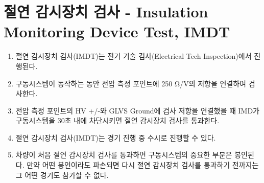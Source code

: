 \documentclass[final,a4paper,10pt]{report}
\begin{document}
\section{절연 감시장치 검사 - Insulation Monitoring Device Test, IMDT}\label{rule:formula-technical.imd-test}
\begin{enumerate}
  \item\label{rule:formula-technical.imd-test.performed-during-tech-inspection} 절연 감시장치 검사(IMDT)는 전기 기술 검사(Electrical Tech Inspection)에서 진행된다.
  \item\label{rule:formula-technical.imd-test.test-resistor-250ohmv} 구동시스템이 동작하는 동안 전압 측정 포인트에 250 Ω/V의 저항을 연결하여 검사한다.
  \item\label{rule:formula-technical.imd-test.trip-within-30s} 전압 측정 포인트의 HV +/-와 GLVS Ground에 검사 저항을 연결했을 때 IMD가 구동시스템을 30초 내에 차단시키면 절연 감시장치 검사를 통과한다.
  \item\label{rule:formula-technical.imd-test.retest-anytime-during-event} 절연 감시장치 검사(IMDT)는 경기 진행 중 수시로 진행할 수 있다.
  \item\label{rule:formula-technical.imd-test.broken-seal-bars-participation} 차량이 처음 절연 감시장치 검사를 통과하면 구동시스템의 중요한 부분은 봉인된다. 만약 어떤 봉인이라도 파손되면 다시 절연 감시장치 검사를 통과하기 전까지는 그 어떤 경기도 참가할 수 없다.
\end{enumerate}
\end{document}
